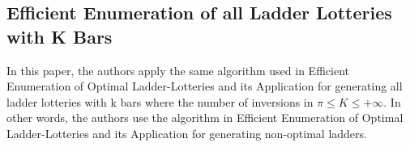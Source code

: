 \subsection{Efficient Enumeration of all Ladder Lotteries with K Bars}

In this paper, the authors apply the same algorithm used in Efficient Enumeration of Optimal Ladder-Lotteries 
and its Application for generating all ladder lotteries with k bars where the number of inversions in $\pi \leq K \leq +\infty$.
In other words, the authors use the algorithm in Efficient Enumeration of Optimal Ladder-Lotteries and its Application for generating 
non-optimal ladders.